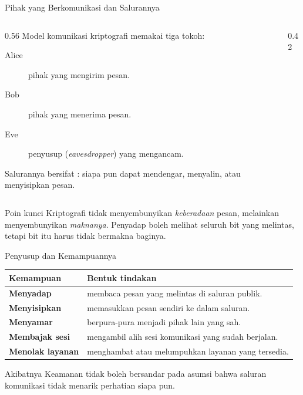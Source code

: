 \documentclass[aspectratio=169,11pt]{beamer}
\begin{document}
\begin{frame}{Pihak yang Berkomunikasi dan Salurannya}
    \begin{columns}[T,onlytextwidth]
        \begin{column}{0.56\textwidth}
            Model komunikasi kriptografi memakai tiga tokoh:
            \begin{description}
                \item[Alice] pihak yang mengirim pesan.
                \item[Bob] pihak yang menerima pesan.
                \item[Eve] penyusup (\textit{eavesdropper}) yang mengancam.
            \end{description}
            \vspace{0.2cm}
            Salurannya bersifat : siapa pun dapat mendengar,
            menyalin, atau menyisipkan pesan.
        \end{column}
        \begin{column}{0.42\textwidth}
            \centering
        \end{column}
    \end{columns}
    \vspace{0.05cm}
    \begin{alertblock}{Poin kunci}
        Kriptografi tidak menyembunyikan \emph{keberadaan} pesan, melainkan
        menyembunyikan \emph{maknanya}. Penyadap boleh melihat seluruh bit yang
        melintas, tetapi bit itu harus tidak bermakna baginya.
    \end{alertblock}
\end{frame}

\begin{frame}{Penyusup dan Kemampuannya}
    \footnotesize
    \begin{tabularx}{\linewidth}{@{}>{\bfseries}p{2.9cm} X@{}}
        \toprule
        Kemampuan & Bentuk tindakan \\
        \midrule
        Menyadap & membaca pesan yang melintas di saluran publik. \\
        \addlinespace
        Menyisipkan & memasukkan pesan sendiri ke dalam saluran. \\
        \addlinespace
        Menyamar & berpura-pura menjadi pihak lain yang sah. \\
        \addlinespace
        Membajak sesi & mengambil alih sesi komunikasi yang sudah berjalan. \\
        \addlinespace
        Menolak layanan & menghambat atau melumpuhkan layanan yang tersedia. \\
        \bottomrule
    \end{tabularx}
    \vspace{0.25cm}
    \begin{block}{Akibatnya}
        Keamanan tidak boleh bersandar pada asumsi bahwa saluran komunikasi tidak
        menarik perhatian siapa pun.
    \end{block}
\end{frame}
\end{document}
